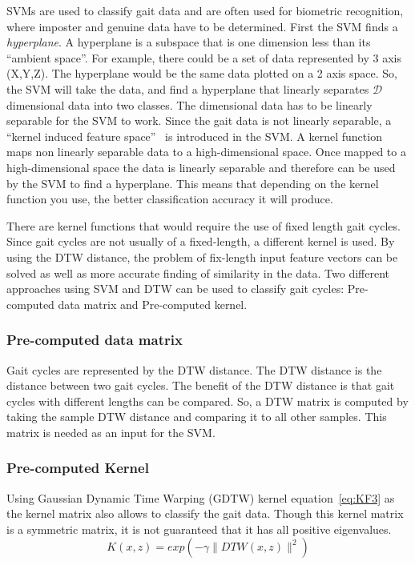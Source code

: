 \documentclass{sig-alternate}
\begin{document}
	SVMs are used to classify gait data and are often used for biometric recognition, where imposter and genuine data have to be determined. First the SVM finds a \textit{hyperplane}. A hyperplane is a subspace that is one dimension less than its ``ambient space''. For example, there could be a set of data represented by 3 axis (X,Y,Z). The hyperplane would be the same data plotted on a 2 axis space. So, the SVM will take the data, and find a hyperplane that linearly separates \begin{math}\mathcal{D} \end{math} dimensional data into two classes. The dimensional data has to be linearly separable for the SVM to work. Since the gait data is not linearly separable, a ``kernel induced feature space''~\cite{Muaaz:2013} is introduced in the SVM. A kernel function maps non linearly separable data to a high-dimensional space. Once mapped to a high-dimensional space the data is linearly separable and therefore can be used by the SVM to find a hyperplane. This means that depending on the kernel function you use, the better classification accuracy it will produce. 

There are kernel functions that would require the use of fixed length gait cycles. Since gait cycles are not usually of a fixed-length, a different kernel is used. By using the DTW distance, the problem of fix-length input feature vectors can be solved as well as more accurate finding of similarity in the data. Two different approaches using SVM and DTW can be used to classify gait cycles: Pre-computed data matrix and Pre-computed kernel.

\subsubsection{Pre-computed data matrix}
	Gait cycles are represented by the DTW distance. The DTW distance is the distance between two gait cycles. The benefit of the DTW distance is that gait cycles with different lengths can be compared. So, a DTW matrix is computed by taking the sample DTW distance and comparing it to all other samples. This matrix is needed as an input for the SVM.	

\subsubsection{Pre-computed Kernel}
Using Gaussian Dynamic Time Warping (GDTW) kernel equation~\eqref{eq:KF3} as the kernel matrix also allows to classify the gait data. Though this kernel matrix is a symmetric matrix, it is not guaranteed that it has all positive eigenvalues. 
\begin{equation} \label{eq:KF3}
K(x,z)=exp(-\gamma \parallel DTW(x,z) \parallel ^2)
\end{equation}	
\end{document}
